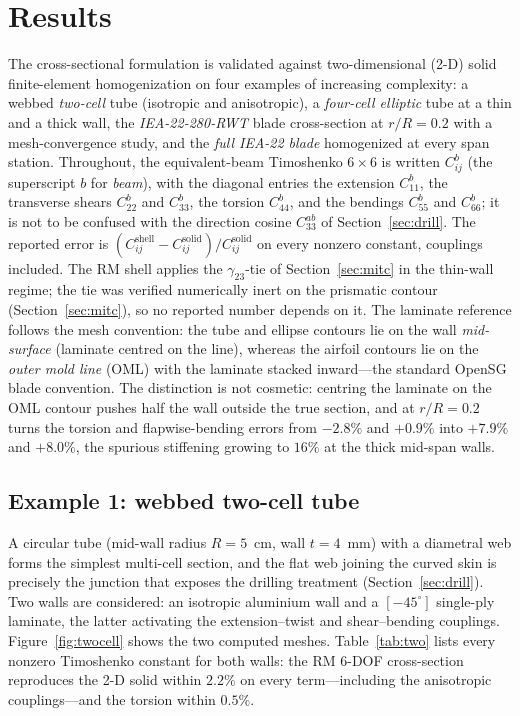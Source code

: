 \section{Results}\label{sec:results}
The cross-sectional formulation is validated against two-dimensional (2-D) solid
finite-element homogenization on four examples of increasing complexity: a webbed
\emph{two-cell} tube (isotropic and anisotropic), a \emph{four-cell elliptic} tube at a
thin and a thick wall, the \emph{IEA-22-280-RWT} blade cross-section at $r/R=0.2$ with a
mesh-convergence study, and the \emph{full IEA-22 blade} homogenized at every span
station. Throughout, the equivalent-beam Timoshenko $6\times6$ is written $C^{b}_{ij}$
(the superscript $b$ for \emph{beam}), with the diagonal entries the extension
$C^{b}_{11}$, the transverse shears $C^{b}_{22}$ and $C^{b}_{33}$, the torsion
$C^{b}_{44}$, and the bendings $C^{b}_{55}$ and $C^{b}_{66}$; it is not to be confused
with the direction cosine $C^{ab}_{33}$ of Section~\ref{sec:drill}. The reported error is
$(C_{ij}^{\mathrm{shell}}-C_{ij}^{\mathrm{solid}})/C_{ij}^{\mathrm{solid}}$ on every
nonzero constant, couplings included. The RM shell applies the $\gamma_{23}$-tie of
Section~\ref{sec:mitc} in the thin-wall regime; the tie was verified numerically inert
on the prismatic contour (Section~\ref{sec:mitc}), so no reported number depends on it.
The laminate reference follows the mesh convention: the tube and ellipse contours lie on
the wall \emph{mid-surface} (laminate centred on the line), whereas the airfoil contours
lie on the \emph{outer mold line} (OML) with the laminate stacked inward---the standard
OpenSG blade convention. The distinction is not cosmetic: centring the laminate on the
OML contour pushes half the wall outside the true section, and at $r/R=0.2$ turns the
torsion and flapwise-bending errors from $-2.8\%$ and $+0.9\%$ into $+7.9\%$ and
$+8.0\%$, the spurious stiffening growing to $16\%$ at the thick mid-span walls.

\subsection{Example 1: webbed two-cell tube}\label{sec:res_two}
A circular tube (mid-wall radius $R=5$~cm, wall $t=4$~mm) with a diametral web forms the
simplest multi-cell section, and the flat web joining the curved skin is precisely the
junction that exposes the drilling treatment (Section~\ref{sec:drill}). Two walls are
considered: an isotropic aluminium wall and a $[-45^\circ]$ single-ply laminate, the
latter activating the extension--twist and shear--bending couplings.
Figure~\ref{fig:twocell} shows the two computed meshes. Table~\ref{tab:two} lists every
nonzero Timoshenko constant for both walls: the RM 6-DOF cross-section reproduces the
2-D solid within $2.2\%$ on every term---including the anisotropic couplings---and the
torsion within $0.5\%$.

